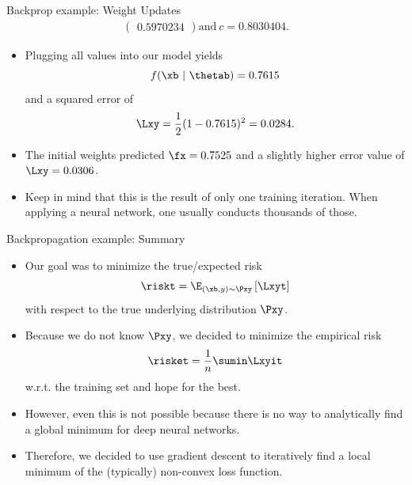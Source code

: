 \begin{vbframe}{Backprop example: Weight Updates}
\begin{eqnarray*}
\begin{pmatrix}
    \num[round-mode=places,round-precision=4]{0.5970234}
    \end{pmatrix}
    \text{and} \ c = \num[round-mode=places,round-precision=4]{0.8030404}\text{.}
  \end{eqnarray*}
\framebreak  
  \begin{itemize}
    \item Plugging all values into our model yields $$f(\xb ~|~\thetab) = \num[round-mode=places,round-precision=4]{0.7614865}$$ and a squared error of $$\Lxy = \frac{1}{2}(1 - \num[round-mode=places,round-precision=4]{0.7614865})^2 = \num[round-mode=places,round-precision=4]{0.02844434}.$$
    \item The initial weights predicted $\fx = \num[round-mode=places,round-precision=4]{0.7525469}$ and a slightly higher error value of $\Lxy = \num[round-mode=places,round-precision=4]{0.03061652}$.
    \lz
    \item Keep in mind that this is the result of only one training iteration. When applying a neural network, one usually conducts thousands of those.
  \end{itemize}
\end{vbframe}

\begin{frame} {Backpropagation example: Summary}
  \begin{itemize}
    \item Our goal was to minimize the true/expected risk $$\riskt = \E_{(\xb, y)\sim \Pxy} \left[\Lxyt\right]$$
    with respect to the true underlying distribution $\Pxy$.
    \item Because we do not know $\Pxy$, we decided to minimize the empirical risk $$\risket = \frac{1}{n} \sumin \Lxyit$$ w.r.t. the training set and hope for the best.
    \item However, even this is not possible because there is no way to analytically find a global minimum for deep neural networks.
    \item Therefore, we decided to use gradient descent to iteratively find a local minimum of the (typically) non-convex loss function.
  \end{itemize}
\end{frame}

